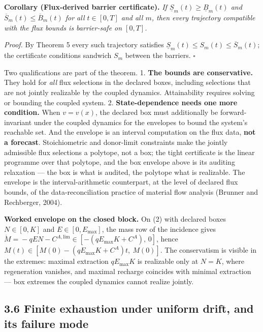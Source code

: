 \documentclass[11pt]{article}
\begin{document}
\textbf{Corollary (Flux-derived barrier certificate).} \emph{If \(\underline{S}_m(t) \ge \underline{B}_m(t)\) and \(\overline{S}_m(t) \le \overline{B}_m(t)\) for all \(t \in [0,T]\) and all \(m\), then every trajectory compatible with the flux bounds is barrier-safe on \([0,T]\).}

\emph{Proof.} By Theorem 5 every such trajectory satisfies \(\underline{S}_m(t) \le S_m(t) \le \overline{S}_m(t)\); the certificate conditions sandwich \(S_m\) between the barriers. \(\square\)

Two qualifications are part of the theorem. 1. \textbf{The bounds are conservative.} They hold for \emph{all} flux selections in the declared boxes, including selections that are not jointly realizable by the coupled dynamics. Attainability requires solving or bounding the coupled system. 2. \textbf{State-dependence needs one more condition.} When \(v=v(x)\), the declared box must additionally be forward-invariant under the coupled dynamics for the envelopes to bound the system's reachable set. And the envelope is an interval computation on the flux data, \textbf{not a forecast}. Stoichiometric and donor-limit constraints make the jointly admissible flux selections a polytope, not a box; the tight certificate is the linear programme over that polytope, and the box envelope above is its auditing relaxation --- the box is what is audited, the polytope what is realizable. The envelope is the interval-arithmetic counterpart, at the level of declared flux bounds, of the data-reconciliation practice of material flow analysis (Brunner and Rechberger, 2004).

\textbf{Worked envelope on the closed block.} On (2) with declared boxes \(N \in [0, K]\) and \(E \in [0, E_{\max}]\), the mass row of the incidence gives \(\dot M =\allowbreak{} -qEN - C^{A,\allowbreak{}\mathrm{lim}} \in [-(qE_{\max}K +\allowbreak{} C^A),\allowbreak{}\,\allowbreak{} 0]\), hence \(M(t) \in [M(0) - (qE_{\max}K +\allowbreak{} C^A)t,\allowbreak{}\ M(0)]\). The conservatism is visible in the extremes: maximal extraction \(qE_{\max}K\) is realizable only at \(N=K\), where regeneration vanishes, and maximal recharge coincides with minimal extraction --- box extremes the coupled dynamics cannot realize jointly.

\subsection*{3.6 Finite exhaustion under uniform drift, and its failure mode}\label{36-finite-exhaustion-under-uniform-drift-and-its-failure-mode}
\end{document}
